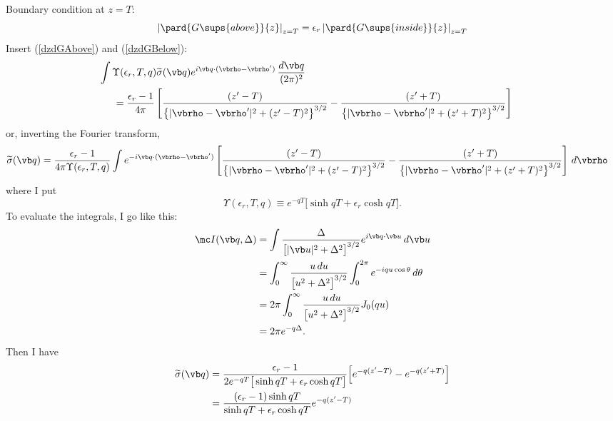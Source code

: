 \documentclass[letterpaper]{article}
\renewcommand{\wt}{\widetilde}
\begin{document}
Boundary condition at $z=T$:
$$            \left|\pard{G\sups{above}}{z}\right|_{z=T} = 
   \epsilon_r \left|\pard{G\sups{inside}}{z}\right|_{z=T} 
$$
Insert (\ref{dzdGAbove}) and (\ref{dzdGBelow}):
\begin{align*}
&\hspace{-0.2in}
\int \Upsilon(\epsilon_r,T,q) \wt\sigma(\vb q) e^{i\vb q \cdot (\vbrho-\vbrho^\prime)} 
\, \frac{d\vb q}{(2\pi)^2}
\\
&=\frac{\epsilon_r-1}{4\pi}
   \left[\frac{(z^\prime-T)}
           {\big\{ |\vbrho-\vbrho^\prime|^2 + (z^\prime-T)^2\big\}^{3/2}}
        -\frac{(z^\prime+T)}
           {\big\{ |\vbrho-\vbrho^\prime|^2 + (z^\prime+T)^2\big\}^{3/2}}
   \right]
\end{align*}
or, inverting the Fourier transform,
\begin{align*}
\wt \sigma(\vb q)
&=\frac{\epsilon_r-1}{4\pi\Upsilon(\epsilon_r, T, q)}
  \int e^{-i\vb q \cdot (\vbrho-\vbrho^\prime)}
   \left[\frac{(z^\prime-T)}
           {\big\{ |\vbrho-\vbrho^\prime|^2 + (z^\prime-T)^2\big\}^{3/2}}
        -\frac{(z^\prime+T)}
           {\big\{ |\vbrho-\vbrho^\prime|^2 + (z^\prime+T)^2\big\}^{3/2}}
   \right]
  \,d\vbrho
\end{align*}
where I put
$$ \Upsilon(\epsilon_r, T, q) \equiv
   e^{-qT}\Big[\sinh qT + \epsilon_r \cosh qT\Big].
$$
To evaluate the integrals, I go like this:
\begin{align*} 
 \mc I(\vb q, \Delta) 
&= 
 \int \frac{\Delta}{ \big[|\vb u|^2 + \Delta^2\big]^{3/2}}
  e^{i\vb q \cdot \vb u} \, d\vb u
\\
&= \int_0^\infty \frac{u\,du}{\big[u^2 + \Delta^2\big]^{3/2}}
   \int_0^{2\pi} e^{-i q u \cos\theta}\,d\theta 
\\
&= 2\pi \int_0^\infty \frac{u\,du}{\big[u^2 + \Delta^2\big]^{3/2}}J_0(qu)
\\
&= 2\pi e^{-q\Delta}.
\end{align*}
Then I have
\begin{align*}
 \wt{\sigma}(\vb q)
 &=\frac{\epsilon_r-1}{2e^{-qT}\big[\sinh qT + \epsilon_r \cosh qT\big]}
    \Big[ e^{-q(z^\prime-T)} - e^{-q(z^\prime+T)}\Big]
\\
&=
 \frac{ (\epsilon_r-1)\sinh qT }{ \sinh qT + \epsilon_r \cosh qT}
 e^{-q(z^\prime - T)}
\end{align*}
   
\end{document}

